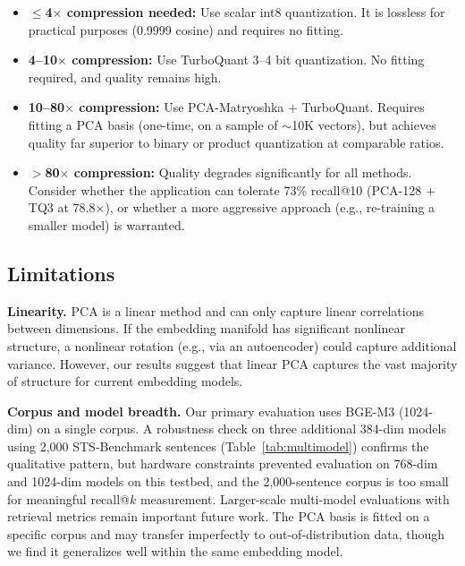 \documentclass[journal]{IEEEtran}
\begin{document}
\begin{itemize}
  \item \textbf{$\leq$4$\times$ compression needed:} Use scalar int8 quantization.
  It is lossless for practical purposes (0.9999 cosine) and requires no fitting.

  \item \textbf{4--10$\times$ compression:} Use TurboQuant 3--4 bit quantization.
  No fitting required, and quality remains high.

  \item \textbf{10--80$\times$ compression:} Use PCA-Matryoshka + TurboQuant.
  Requires fitting a PCA basis (one-time, on a sample of $\sim$10K vectors), but achieves quality far superior to binary or product quantization at comparable ratios.

  \item \textbf{$>$80$\times$ compression:} Quality degrades significantly for all methods.
  Consider whether the application can tolerate 73\% recall@10 (PCA-128 + TQ3 at 78.8$\times$), or whether a more aggressive approach (e.g., re-training a smaller model) is warranted.
\end{itemize}

\subsection{Limitations}

\textbf{Linearity.}
PCA is a linear method and can only capture linear correlations between dimensions.
If the embedding manifold has significant nonlinear structure, a nonlinear rotation (e.g., via an autoencoder) could capture additional variance.
However, our results suggest that linear PCA captures the vast majority of structure for current embedding models.

\textbf{Corpus and model breadth.}
Our primary evaluation uses BGE-M3 (1024-dim) on a single corpus.
A robustness check on three additional 384-dim models using 2{,}000
STS-Benchmark sentences (Table~\ref{tab:multimodel}) confirms the
qualitative pattern, but hardware constraints prevented evaluation on
768-dim and 1024-dim models on this testbed, and the 2{,}000-sentence
corpus is too small for meaningful recall@$k$ measurement.
Larger-scale multi-model evaluations with retrieval metrics remain
important future work.
The PCA basis is fitted on a specific corpus and may transfer
imperfectly to out-of-distribution data, though we find it generalizes
well within the same embedding model.
\end{document}
